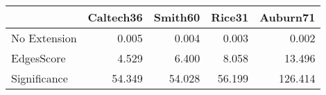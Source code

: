 \begin{tabular}{lrrrr}
\toprule
{} & Caltech36 & Smith60 & Rice31 & Auburn71 \\
\midrule
No Extension &     0.005 &   0.004 &  0.003 &    0.002 \\
EdgesScore   &     4.529 &   6.400 &  8.058 &   13.496 \\
Significance &    54.349 &  54.028 & 56.199 &  126.414 \\
\bottomrule
\end{tabular}
